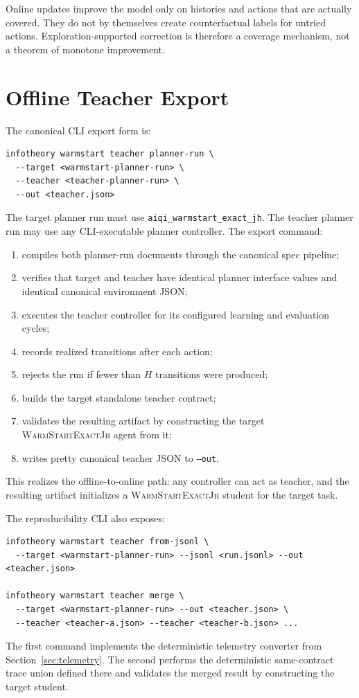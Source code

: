 \documentclass[11pt]{article}
\newcommand{\Warm}{\textnormal{\textsc{WarmStartExactJh}}}
\begin{document}
Online updates improve the model only on histories and actions that are
actually covered. They do not by themselves create counterfactual labels for
untried actions. Exploration-supported correction is therefore a coverage
mechanism, not a theorem of monotone improvement.

\section{Offline Teacher Export}
\label{sec:offline-export}

The canonical CLI export form is:
\begin{verbatim}
infotheory warmstart teacher planner-run \
  --target <warmstart-planner-run> \
  --teacher <teacher-planner-run> \
  --out <teacher.json>
\end{verbatim}
The target planner run must use \texttt{aiqi\_warmstart\_exact\_jh}. The
teacher planner run may use any CLI-executable planner controller. The export
command:
\begin{enumerate}
    \item compiles both planner-run documents through the canonical spec
    pipeline;
    \item verifies that target and teacher have identical planner interface
    values and identical canonical environment JSON;
    \item executes the teacher controller for its configured learning and
    evaluation cycles;
    \item records realized transitions after each action;
    \item rejects the run if fewer than \(H\) transitions were produced;
    \item builds the target standalone teacher contract;
    \item validates the resulting artifact by constructing the target
    \Warm{} agent from it;
    \item writes pretty canonical teacher JSON to \texttt{--out}.
\end{enumerate}
This realizes the offline-to-online path: any controller can act as teacher,
and the resulting artifact initializes a \Warm{} student for the target task.

The reproducibility CLI also exposes:
\begin{verbatim}
infotheory warmstart teacher from-jsonl \
  --target <warmstart-planner-run> --jsonl <run.jsonl> --out <teacher.json>

infotheory warmstart teacher merge \
  --target <warmstart-planner-run> --out <teacher.json> \
  --teacher <teacher-a.json> --teacher <teacher-b.json> ...
\end{verbatim}
The first command implements the deterministic telemetry converter from
Section~\ref{sec:telemetry}. The second performs the deterministic
same-contract trace union defined there and validates the merged result by
constructing the target student.
\end{document}
